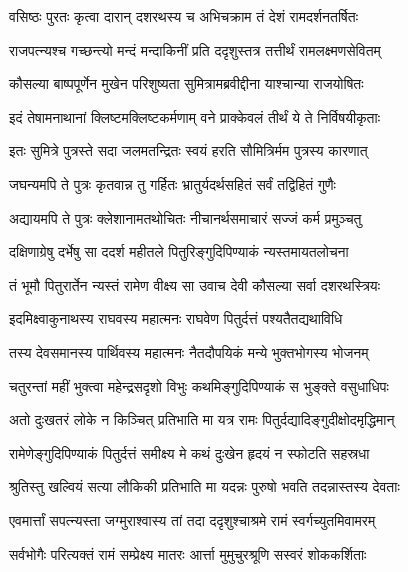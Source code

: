 
\twolineshloka
{वसिष्ठः पुरतः कृत्वा दारान् दशरथस्य च}
{अभिचक्राम तं देशं रामदर्शनतर्षितः} %

\twolineshloka
{राजपत्न्यश्च गच्छन्त्यो मन्दं मन्दाकिनीं प्रति}
{ददृशुस्तत्र तत्तीर्थं रामलक्ष्मणसेवितम्} %

\twolineshloka
{कौसल्या बाष्पपूर्णेन मुखेन परिशुष्यता}
{सुमित्रामब्रवीद्दीना याश्चान्या राजयोषितः} %

\twolineshloka
{इदं तेषामनाथानां क्लिष्टमक्लिष्टकर्मणाम्}
{वने प्राक्केवलं तीर्थं ये ते निर्विषयीकृताः} %

\twolineshloka
{इतः सुमित्रे पुत्रस्ते सदा जलमतन्द्रितः}
{स्वयं हरति सौमित्रिर्मम पुत्रस्य कारणात्} %

\twolineshloka
{जघन्यमपि ते पुत्रः कृतवान्न तु गर्हितः}
{भ्रातुर्यदर्थसहितं सर्वं तद्विहितं गुणैः} %

\twolineshloka
{अद्यायमपि ते पुत्रः क्लेशानामतथोचितः}
{नीचानर्थसमाचारं सज्जं कर्म प्रमुञ्चतु} %

\twolineshloka
{दक्षिणाग्रेषु दर्भेषु सा ददर्श महीतले}
{पितुरिङ्गुदिपिण्याकं न्यस्तमायतलोचना} %

\twolineshloka
{तं भूमौ पितुरार्तेन न्यस्तं रामेण वीक्ष्य सा}
{उवाच देवी कौसल्या सर्वा दशरथस्त्रियः} %

\twolineshloka
{इदमिक्ष्वाकुनाथस्य राघवस्य महात्मनः}
{राघवेण पितुर्दत्तं पश्यतैतद्यथाविधि} %

\twolineshloka
{तस्य देवसमानस्य पार्थिवस्य महात्मनः}
{नैतदौपयिकं मन्ये भुक्तभोगस्य भोजनम्} %

\twolineshloka
{चतुरन्तां महीं भुक्त्वा महेन्द्रसदृशो विभुः}
{कथमिङ्गुदिपिण्याकं स भुङ्क्ते वसुधाधिपः} %

\twolineshloka
{अतो दुःखतरं लोके न किञ्चित् प्रतिभाति मा}
{यत्र रामः पितुर्दद्यादिङ्गुदीक्षोदमृद्धिमान्} %

\twolineshloka
{रामेणेङ्गुदिपिण्याकं पितुर्दत्तं समीक्ष्य मे}
{कथं दुःखेन हृदयं न स्फोटति सहस्रधा} %

\twolineshloka
{श्रुतिस्तु खल्वियं सत्या लौकिकी प्रतिभाति मा}
{यदन्नः पुरुषो भवति तदन्नास्तस्य देवताः} %

\twolineshloka
{एवमार्त्तां सपत्न्यस्ता जग्मुराश्वास्य तां तदा}
{ददृशुश्चाश्रमे रामं स्वर्गच्युतमिवामरम्} %

\twolineshloka
{सर्वभोगैः परित्यक्तं रामं सम्प्रेक्ष्य मातरः}
{आर्त्ता मुमुचुरश्रूणि सस्वरं शोककर्शिताः} %

